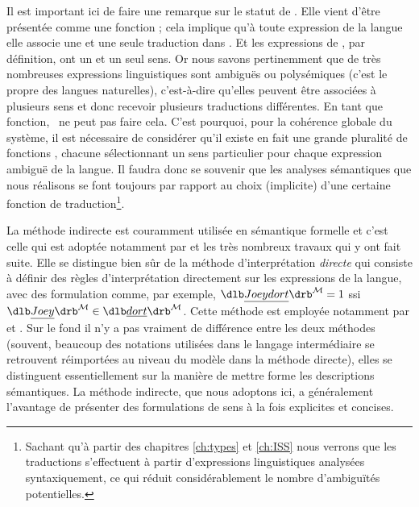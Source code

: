 \fussy

Il est important ici de faire une remarque sur le statut de \Ftrad.  Elle vient d'être présentée comme une fonction ; cela implique qu'à toute expression de la langue elle associe une et une seule traduction dans {\LO}.  Et les expressions de {\LO}, par définition, ont un et un seul sens.  Or 
nous savons pertinemment que de très nombreuses expressions linguistiques 
sont ambiguës ou polysémiques (c'est le propre des langues naturelles), c'est-à-dire qu'elles peuvent être associées à plusieurs sens et donc recevoir plusieurs traductions différentes.  En tant que fonction, \Ftrad\ ne peut pas faire cela.  C'est pourquoi, pour la cohérence globale du système, il est nécessaire de considérer qu'il existe en fait une grande pluralité de fonctions \Ftrad, chacune sélectionnant un sens particulier pour chaque expression ambiguë de la langue.  
Il faudra donc se souvenir que les analyses sémantiques que nous réalisons se font toujours par rapport au choix (implicite) d'une certaine fonction de traduction\footnote{Sachant qu'à partir des chapitres \ref{ch:types} et \ref{ch:ISS} nous verrons que les traductions s'effectuent à partir d'expressions linguistiques analysées syntaxiquement, ce qui réduit considérablement le nombre d'ambiguïtés potentielles.}.

La méthode indirecte est couramment utilisée en sémantique formelle et c'est celle qui est adoptée notamment par \citet{PTQ} et les très nombreux travaux qui y ont fait suite.
Elle se distingue bien sûr de la méthode d'interprétation \emph{directe}
qui consiste à définir des règles d'interprétation directement sur les expressions de la langue, avec des formulation comme, par exemple, $\denote{\sicut{Joey dort}}^{\Modele}=1$ ssi $\denote{\sicut{Joey}}^{\Modele}\in\denote{\sicut{dort}}^{\Modele}$.  Cette méthode est employée notamment par \citet{Montague:EFL} et \citet{HeimKratzer:97}.  Sur le fond il n'y a pas vraiment de différence entre les deux méthodes (souvent, beaucoup des notations utilisées dans le langage intermédiaire se retrouvent réimportées au niveau du modèle dans la méthode directe), elles se distinguent essentiellement sur la manière de mettre forme les descriptions sémantiques.  La méthode indirecte, que nous adoptons ici, a généralement l'avantage de présenter des formulations de sens à la fois explicites et concises.

\medskip

